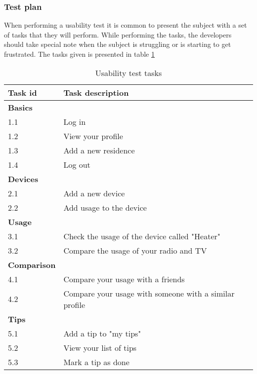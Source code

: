 \subsubsection{Test plan}
When performing a usability test it is common to present the subject with a set of tasks that they will perform. While performing the tasks, the developers should take special note when the subject is struggling or is starting to get frustrated. The tasks given is presented in table \ref{tab:usabilityTests}

\begin{table}[H]
\begin{tabular}{|l|p{10.5cm}|}
\hline
\textbf{Task id }& \textbf{Task description}\\\hline
\textbf{Basics }&\\\hline
1.1 & Log in\\\hline
1.2 & View your profile\\\hline
1.3 & Add a new residence\\\hline
1.4 & Log out\\\hline
\textbf{Devices}&\\\hline
2.1 & Add a new device\\\hline
2.2 & Add usage to the device\\\hline
\textbf{Usage}&\\\hline
3.1 & Check the usage of the device called "Heater"\\\hline
3.2 & Compare the usage of your radio and TV\\\hline
\textbf{Comparison}&\\\hline
4.1 & Compare your usage with a friends\\\hline
4.2 & Compare your usage with someone with a similar profile\\\hline
\textbf{Tips}&\\\hline
5.1 & Add a tip to "my tips"\\\hline
5.2 & View your list of tips\\\hline
5.3 & Mark a tip as done\\\hline
\end{tabular}
\caption{Usability test tasks}
\label{tab:usabilityTests}
\end{table}